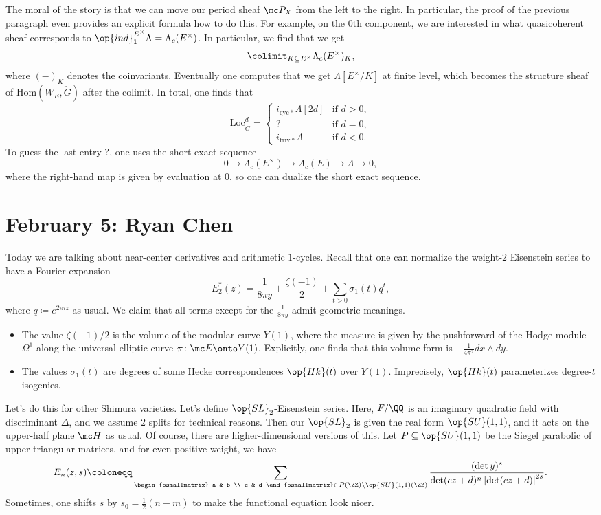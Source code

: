 \documentclass{article}
\begin{document}
The moral of the story is that we can move our period sheaf $\mc P_X$ from the left to the right. In particular, the proof of the previous paragraph even provides an explicit formula how to do this. For example, on the $0$th component, we are interested in what quasicoherent sheaf corresponds to $\op{ind}_1^{E^\times}\Lambda=\Lambda_c(E^\times)$. In particular, we find that we get
\[\colimit_{K\subseteq E^\times}\Lambda_c(E^\times)_K,\]
where $(-)_K$ denotes the coinvariants. Eventually one computes that we get $\Lambda[E^\times/K]$ at finite level, which becomes the structure sheaf of $\mathrm{Hom}(W_E,\check G)$ after the colimit. In total, one finds that
\[\mathrm{Loc}_{\check G}^d=\begin{cases}
	i_{\mathrm{cyc}*}\Lambda[2d] & \text{if }d>0, \\
	? & \text{if }d=0, \\
	i_{\mathrm{triv}*}\Lambda & \text{if }d<0.
\end{cases}\]
To guess the last entry $?$, one uses the short exact sequence
\[0\to\Lambda_c(E^\times)\to\Lambda_c(E)\to\Lambda\to0,\]
where the right-hand map is given by evaluation at $0$, so one can dualize the short exact sequence.

\section{February 5: Ryan Chen}
Today we are talking about near-center derivatives and arithmetic $1$-cycles. Recall that one can normalize the weight-$2$ Eisenstein series to have a Fourier expansion
\[E_2^*(z)=\frac1{8\pi y}+\frac{\zeta(-1)}2+\sum_{t>0}\sigma_1(t)q^t,\]
where $q\coloneqq e^{2\pi iz}$ as usual. We claim that all terms except for the $\frac1{8\pi y}$ admit geometric meanings.
\begin{itemize}
	\item The value $\zeta(-1)/2$ is the volume of the modular curve $Y(1)$, where the measure is given by the pushforward of the Hodge module $\Omega^1$ along the universal elliptic curve $\pi\colon\mc E\onto Y(1)$. Explicitly, one finds that this volume form is $-\frac1{4\pi^2}dx\land dy$.
	\item The values $\sigma_1(t)$ are degrees of some Hecke correspondences $\op{Hk}(t)$ over $Y(1)$. Imprecisely, $\op{Hk}(t)$ parameterizes degree-$t$ isogenies.
\end{itemize}
Let's do this for other Shimura varieties. Let's define $\op{SL}_2$-Eisenstein series. Here, $F/\QQ$ is an imaginary quadratic field with discriminant $\Delta$, and we assume $2$ splits for technical reasons. Then our $\op{SL}_2$ is given the real form $\op{SU}(1,1)$, and it acts on the upper-half plane $\mc H$ as usual. Of course, there are higher-dimensional versions of this. Let $P\subseteq\op{SU}(1,1)$ be the Siegel parabolic of upper-triangular matrices, and for even positive weight, we have
\[E_n(z,s)\coloneqq\sum_{\begin{bsmallmatrix}
	a & b \\ c & d
\end{bsmallmatrix}\in P(\ZZ)\backslash\op{SU}(1,1)(\ZZ)}\frac{(\det y)^s}{\det(cz+d)^n\left|\det(cz+d)\right|^{2s}}.\]
Sometimes, one shifts $s$ by $s_0=\frac12(n-m)$ to make the functional equation look nicer.
\end{document}
